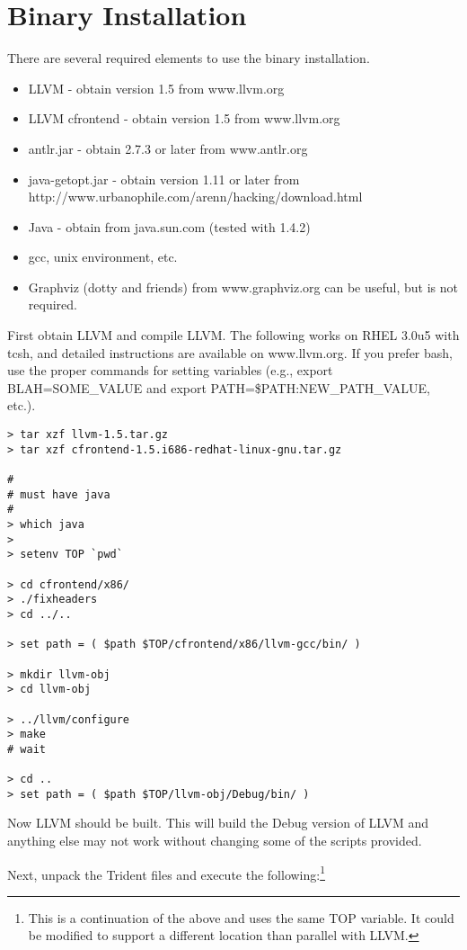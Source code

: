 \section{Binary Installation}
There are several required elements to use the binary installation.

\begin{itemize}
\item LLVM - obtain version 1.5 from www.llvm.org
\item LLVM cfrontend - obtain version 1.5 from www.llvm.org
\item antlr.jar - obtain 2.7.3 or later from www.antlr.org
\item java-getopt.jar - obtain version 1.11 or later from \\
http://www.urbanophile.com/arenn/hacking/download.html
\item Java - obtain from java.sun.com (tested with 1.4.2)
\item gcc, unix environment, etc.
\item Graphviz (dotty and friends) from www.graphviz.org can be useful, but is not required.
\end{itemize}

First obtain LLVM and compile LLVM.  The following works on RHEL 3.0u5
with tcsh, and detailed instructions are available on www.llvm.org.
If you prefer bash, use the proper commands for setting variables
(e.g., export BLAH=SOME\_VALUE and export
PATH=\$PATH:NEW\_PATH\_VALUE, etc.).

\begin{verbatim}
> tar xzf llvm-1.5.tar.gz
> tar xzf cfrontend-1.5.i686-redhat-linux-gnu.tar.gz

#
# must have java
#
> which java
>
> setenv TOP `pwd`

> cd cfrontend/x86/
> ./fixheaders
> cd ../..

> set path = ( $path $TOP/cfrontend/x86/llvm-gcc/bin/ )

> mkdir llvm-obj
> cd llvm-obj

> ../llvm/configure
> make
# wait 

> cd ..
> set path = ( $path $TOP/llvm-obj/Debug/bin/ )

\end{verbatim}

Now LLVM should be built.  This will build the Debug version of LLVM and anything
else may not work without changing some of the scripts provided.

Next, unpack the Trident files and execute the following:\footnote{This is a continuation of the above
and uses the same TOP variable.  It could be modified to support a different location than parallel
with LLVM.}

